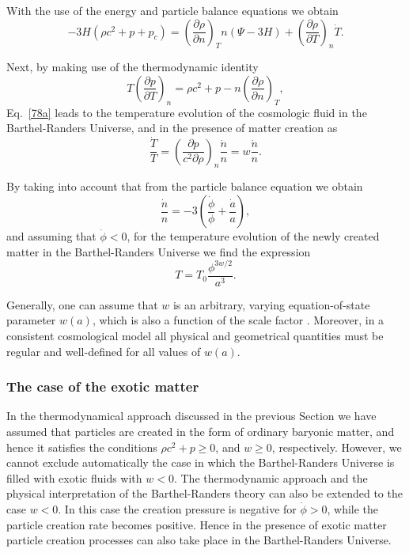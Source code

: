\documentclass[aps,superscriptaddress, showpacs,preprintnumbers, superscriptaddress, nofootinbibt,twocolumn]{revtex4-2}
\def\be{\begin{equation}}
\def\ee{\end{equation}}
\begin{document}
With the  use of the energy and particle balance equations we obtain
\begin{equation}  \label{78a}
-3H\left(\rho c^2+p+p_c\right)=\left(\frac{\partial \rho }{\partial n}
\right)_T n\left(\Psi-3H\right)
+\left(\frac{\partial \rho }{\partial T} \right)_n\dot{T}.
\end{equation}

Next, by making use of the thermodynamic identity \cite{Bar}
\begin{equation}
T\left(\frac{\partial p}{\partial T}\right)_n=\rho c^2+p-n\left(\frac{\partial
\rho}{\partial n}\right)_T,
\end{equation}
Eq.~\eqref{78a} leads to the temperature evolution of the cosmologic fluid in the Barthel-Randers Universe, and in
the presence of matter creation as
\begin{equation}
\frac{\dot{T}}{T}=\left(\frac{\partial p}{c^2\partial \rho}\right)_n\frac{\dot{n}}{n}=w\frac{\dot{n}}{n}.
\end{equation}

 By taking into account that from the particle balance equation we obtain
 \be
 \frac{\dot{n}}{n}=-3\left(\frac{\dot{\phi}}{\phi}+\frac{\dot{a}}{a}\right),
 \ee
 and assuming that $\dot{\phi}<0$, for the temperature evolution of the newly created matter in the Barthel-Randers Universe we find the expression
 \be
 T=T_0\frac{\phi ^{3w/2}}{a^3}.
 \ee

 Generally, one can assume that $w$ is an arbitrary, varying equation-of-state parameter $w(a)$, which is also a function of the scale factor \cite{r3s}. Moreover, in a consistent cosmological model all physical and geometrical quantities must be regular and well-defined for all values of $w(a)$.

\subsubsection{The case of the exotic matter}

 In the thermodynamical approach discussed in the previous Section we have assumed that particles are created in the form of ordinary baryonic matter, and hence it satisfies the conditions $\rho c^2+p\geq 0$, and  $w\geq 0$, respectively. However, we cannot exclude automatically the case in which the Barthel-Randers Universe is filled with exotic fluids with $w<0$. The thermodynamic approach and the physical interpretation of the Barthel-Randers theory can also be extended to the case $w<0$. In this case the creation pressure is negative for $\dot{\phi}>0$, while the particle creation rate becomes positive. Hence in the presence of exotic matter particle creation processes can also take place in the Barthel-Randers Universe.
\end{document}
